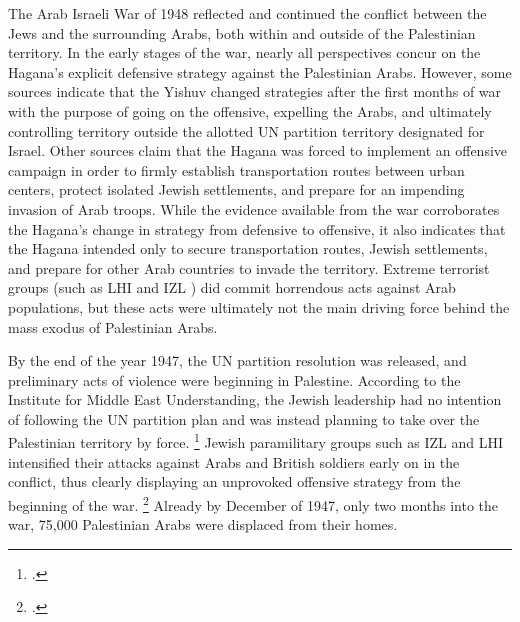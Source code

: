 \documentclass{turabian-researchpaper}
\begin{document}
The Arab Israeli War of 1948 reflected and continued the conflict between the Jews and the surrounding Arabs, both within and outside of the Palestinian territory.  In the early stages of the war, nearly all perspectives concur on the Hagana's explicit defensive strategy against the Palestinian Arabs.  However, some sources indicate that the Yishuv changed strategies after the first months of war with the purpose of going on the offensive, expelling the Arabs, and ultimately controlling territory outside the allotted UN partition territory designated for Israel.  Other sources claim that the Hagana was forced to implement an offensive campaign in order to firmly establish transportation routes between urban centers, protect isolated Jewish settlements, and prepare for an impending invasion of Arab troops.  While the evidence available from the war corroborates the Hagana's change in strategy from defensive to offensive, it also indicates that the Hagana intended only to secure transportation routes, Jewish settlements, and prepare for other Arab countries to invade the territory.  Extreme terrorist groups (such as LHI and IZL ) did commit horrendous acts against Arab populations, but these acts were ultimately not the main driving force behind the mass exodus of Palestinian Arabs.

By the end of the year 1947, the UN partition resolution was released, and preliminary acts of violence were beginning in Palestine.  According to the Institute for Middle East Understanding, the Jewish leadership had no intention of following the UN partition plan and was instead planning to take over the Palestinian territory by force.
\footcite{nabka}
Jewish paramilitary groups such as IZL and LHI intensified their attacks against Arabs and British soldiers early on in the conflict, thus clearly displaying an unprovoked offensive strategy from the beginning of the war.
\footcite{nabka}
Already by December of 1947, only two months into the war, 75,000 Palestinian Arabs were displaced from their homes.
\end{document}

